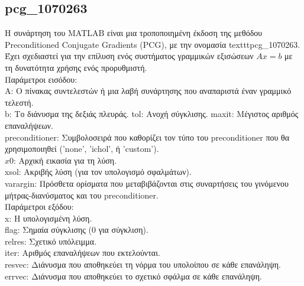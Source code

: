 \documentclass[12pt,a4paper]{article}
\begin{document}
\subsection{pcg\_1070263}
Η συνάρτηση του MATLAB είναι μια τροποποιημένη έκδοση της μεθόδου Preconditioned Conjugate Gradients (PCG), με την ονομασία texttt{pcg\_1070263}. Έχει σχεδιαστεί για την επίλυση ενός συστήματος γραμμικών εξισώσεων $Ax=b$ με τη δυνατότητα χρήσης ενός προρυθμιστή.\\

Παράμετροι εισόδου:\\
A: Ο πίνακας συντελεστών ή μια λαβή συνάρτησης που αναπαριστά έναν γραμμικό τελεστή.\\
b: Το διάνυσμα της δεξιάς πλευράς.
tol: Ανοχή σύγκλισης.
maxit: Μέγιστος αριθμός επαναλήψεων.\\
preconditioner: Συμβολοσειρά που καθορίζει τον τύπο του preconditioner που θα χρησιμοποιηθεί
('none', 'ichol', ή 'custom').\\
$x0$: Αρχική εικασία για τη λύση.\\
xsol: Ακριβής λύση (για τον υπολογισμό σφαλμάτων).\\
varargin: Πρόσθετα ορίσματα που μεταβιβάζονται στις συναρτήσεις του γινόμενου μήτρας-διανύσματος και του preconditioner.\\

Παράμετροι εξόδου:\\
x: Η υπολογισμένη λύση.\\
flag: Σημαία σύγκλισης (0 για σύγκλιση).\\
relres: Σχετικό υπόλειμμα.\\
iter: Αριθμός επαναλήψεων που εκτελούνται.\\
resvec: Διάνυσμα που αποθηκεύει τη νόρμα του υπολοίπου σε κάθε επανάληψη.\\
errvec: Διάνυσμα που αποθηκεύει το σχετικό σφάλμα σε κάθε επανάληψη.\\
\end{document}
